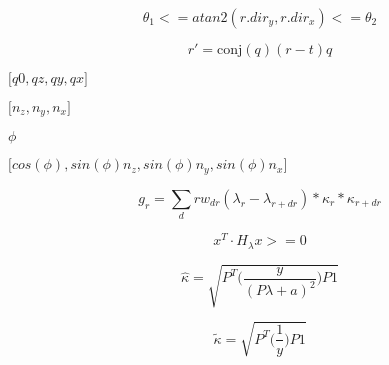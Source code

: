 \documentclass{article}
\begin{document}
\[ \theta_1 <= atan2(r.dir_y,r.dir_x) <= \theta_2 \]
\pagebreak

\[ r' = \mathrm{conj}(q)(r-t)q \]
\pagebreak

${[}q0,qz,qy,qx{]}$
\pagebreak

${[}n_z,n_y,n_x{]}$
\pagebreak

$\phi$
\pagebreak

${[}cos(\phi),sin(\phi) n_z, sin(\phi) n_y, sin(\phi)n_x{]}$
\pagebreak

\[ g_r = \sum_dr w_{dr} (\lambda_r - \lambda_{r+dr}) * \kappa_r * \kappa_{r+dr} \]
\pagebreak

\[ x^T \cdot H_{\lambda}x >= 0 \]
\pagebreak

\[ \hat\kappa = \sqrt{ P^T \bigg( \frac{y}{ (P\lambda+a)^2 } \bigg) P1 } \]
\pagebreak

\[ \tilde\kappa = \sqrt{ P^T \bigg( \frac{1}{y} \bigg)P1 } \]
\pagebreak
\end{document}
